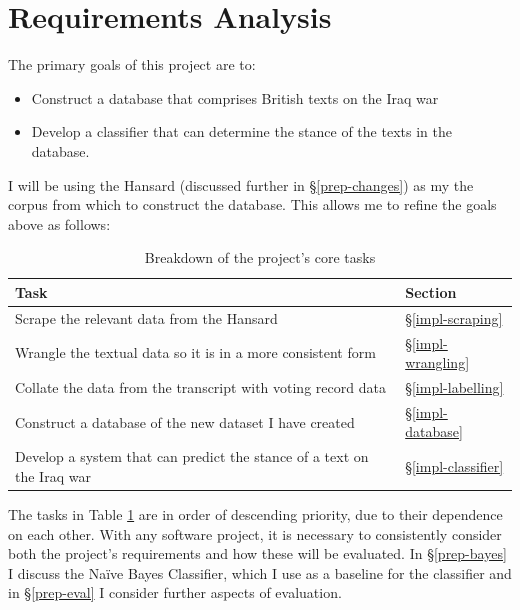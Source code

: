 \documentclass[12pt,a4paper,twoside,openright]{report}
\begin{document}
\section{Requirements Analysis} \label{prep-requirements}
The primary goals of this project are to:
\begin{itemize}
	\item Construct a database that comprises British texts on the Iraq war
	\item Develop a classifier that can determine the stance of the texts in the database.
\end{itemize}

I will be using the Hansard \cite{hansard} (discussed further in \S\ref{prep-changes}) as my the corpus from which to construct the database. This allows me to refine the goals above as follows:
\FloatBarrier
$  $\begin{table}[]
	\label{table:tasks}
	\centering
	\begin{tabular}{@{}ll@{}}
		\toprule
		\textbf{Task}                                                          & \textbf{Section}          \\ \midrule
		Scrape the relevant data from the Hansard                              & \S\ref{impl-scraping}   \\
		Wrangle the textual data so it is in a more consistent form          & \S\ref{impl-wrangling}  \\
	    Collate the data from the transcript with voting record data           & \S\ref{impl-labelling}  \\
	    Construct a database of the new dataset I have created            	   & \S\ref{impl-database}   \\
		Develop a system that can predict the stance of a text on the Iraq war & \S\ref{impl-classifier} \\ \bottomrule
	\end{tabular}
	\caption{Breakdown of the project's core tasks}
\end{table}
\FloatBarrier
The tasks in Table \ref{table:tasks} are in order of descending priority, due to their dependence on each other.
\newline
\newline
With any software project, it is necessary to consistently consider both the project's requirements and how these will be evaluated. In \S\ref{prep-bayes} I discuss the Na\"{i}ve Bayes Classifier, which I use as a baseline for the classifier and in \S\ref{prep-eval} I consider further aspects of evaluation.
\end{document}
